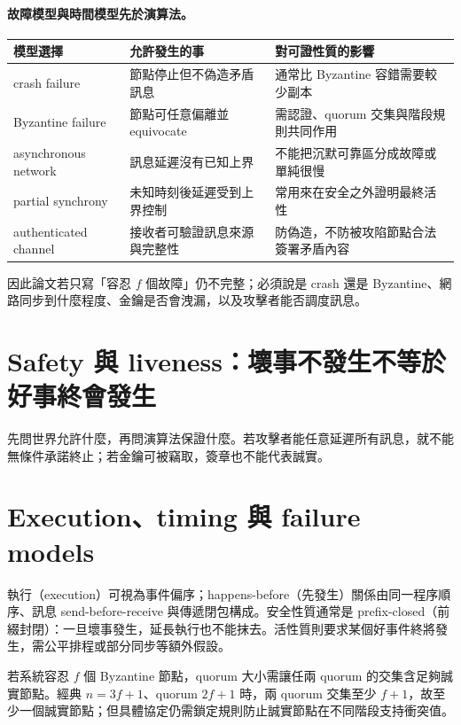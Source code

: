 \documentclass[11pt,a4paper,oneside,openany]{book}
\begin{document}
\paragraph{故障模型與時間模型先於演算法。}
\begin{center}
\begin{tabularx}{.96\textwidth}{@{}lYY@{}}
\toprule
模型選擇 & 允許發生的事 & 對可證性質的影響 \\
\midrule
crash failure & 節點停止但不偽造矛盾訊息 & 通常比 Byzantine 容錯需要較少副本 \\
Byzantine failure & 節點可任意偏離並 equivocate & 需認證、quorum 交集與階段規則共同作用 \\
asynchronous network & 訊息延遲沒有已知上界 & 不能把沉默可靠區分成故障或單純很慢 \\
partial synchrony & 未知時刻後延遲受到上界控制 & 常用來在安全之外證明最終活性\cite{dls-partial-synchrony} \\
authenticated channel & 接收者可驗證訊息來源與完整性 & 防偽造，不防被攻陷節點合法簽署矛盾內容 \\
\bottomrule
\end{tabularx}
\end{center}
因此論文若只寫「容忍 $f$ 個故障」仍不完整；必須說是 crash 還是 Byzantine、網路同步到什麼程度、金鑰是否會洩漏，以及攻擊者能否調度訊息。

\section{Safety 與 liveness：壞事不發生不等於好事終會發生}
\begin{coreintuition}
先問世界允許什麼，再問演算法保證什麼。若攻擊者能任意延遲所有訊息，就不能無條件承諾終止；若金鑰可被竊取，簽章也不能代表誠實。
\end{coreintuition}

\section{Execution、timing 與 failure models}
執行（execution）可視為事件偏序；happens-before（先發生）關係由同一程序順序、訊息 send-before-receive 與傳遞閉包構成。安全性質通常是 prefix-closed（前綴封閉）：一旦壞事發生，延長執行也不能抹去。活性質則要求某個好事件終將發生，需公平排程或部分同步等額外假設。

若系統容忍 $f$ 個 Byzantine 節點，quorum 大小需讓任兩 quorum 的交集含足夠誠實節點。經典 $n=3f+1$、quorum $2f+1$ 時，兩 quorum 交集至少 $f+1$，故至少一個誠實節點；但具體協定仍需鎖定規則防止誠實節點在不同階段支持衝突值。
\end{document}
